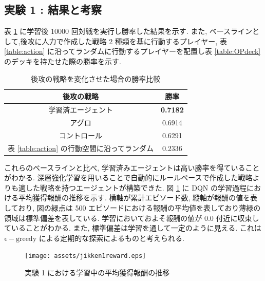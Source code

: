 \documentclass[12pt]{jarticle}
\begin{document}
\subsection{実験 1 : 結果と考察}
表 \ref{table:winratejikken1} に学習後 10000 回対戦を実行し勝率した結果を示す. また, ベースラインとして,後攻に人力で作成した戦略 2 種類を基に行動するプレイヤー, 表 \ref{table:action} に沿ってランダムに行動するプレイヤーを配置し表 \ref{table:OPdeck} のデッキを持たせた際の勝率を示す. 
\begin{table}[ht]
  \centering
  \caption{後攻の戦略を変化させた場合の勝率比較}
  \label{table:winratejikken1}
  \begin{tabular}{|c|c|}
  \hline
  後攻の戦略        & 勝率     \\ \hline \hline
  学習済エージェント    & \textbf{0.7182} \\ \hline
  アグロ          & 0.6914 \\ \hline
  コントロール       & 0.6291 \\ \hline
  表 \ref{table:action} の行動空間に沿ってランダム & 0.2336       \\ \hline
  \end{tabular}
  \end{table}
  これらのベースラインと比べ, 学習済みエージェントは高い勝率を得ていることがわかる. 深層強化学習を用いることで自動的にルールベースで作成した戦略よりも適した戦略を持つエージェントが構築できた.
  図 \ref{fig:jikken1reward} に DQN の学習過程における平均獲得報酬の推移を示す. 横軸が累計エピソード数, 縦軸が報酬の値を表しており, 図の緑点は 500 エピソードにおける報酬の平均値を表しており薄緑の領域は標準偏差を表している. 学習においておよそ報酬の値が 0.0 付近に収束していることがわかる. また, 標準偏差は学習を通して一定のように見える. これは $\mathrm{\epsilon-greedy}$ による定期的な探索によるものと考えられる.
  \begin{figure}[ht]
    \centering
    \texttt{[image: assets/jikken1reward.eps]}
    \vspace{-0.3cm}
    \caption{実験 1 における学習中の平均獲得報酬の推移}
    \label{fig:jikken1reward}
  \end{figure}
  
\end{document}
